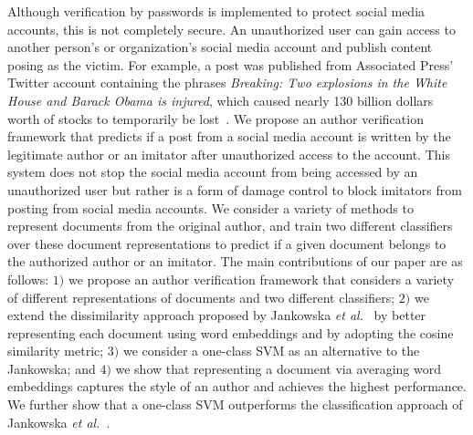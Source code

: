 \documentclass[11pt]{article}
\begin{document}
Although verification by passwords is implemented to protect social
media accounts, this is not completely secure. An unauthorized user
can gain access to another person's or organization's social media
account and publish content posing as the victim. For example, a post
was published from Associated Press' Twitter account containing the
phrases \textit{Breaking: Two explosions in the White House and Barack
  Obama is injured}, which caused nearly 130 billion dollars worth of
stocks to temporarily be lost~\cite{financialTimes}. We propose an
author verification framework that predicts if a post from a social
media account is written by the legitimate author or an imitator after
unauthorized access to the account. This system does not stop the
social media account from being accessed by an unauthorized user but
rather is a form of damage control to block imitators from posting
from social media accounts. We consider a variety of methods to
represent documents from the original author, and train two different
classifiers over these document representations to predict if a given
document belongs to the authorized author or an imitator. The main
contributions of our paper are as follows: $1)$ we propose an author
verification framework that considers a variety of different
representations of documents and two different classifiers; $2)$ we
extend the dissimilarity approach proposed by Jankowska \emph{et
  al.}~\cite{jankowska2014} by better representing each document using
word embeddings and by adopting the cosine similarity metric; $3)$ we
consider a one-class SVM as an alternative to the Jankowska; and $4)$
we show that representing a document via averaging word embeddings
captures the style of an author and achieves the highest
performance. We further show that a one-class SVM outperforms the
classification approach of Jankowska \emph{et
  al.}~\cite{jankowska2014}.
\end{document}
